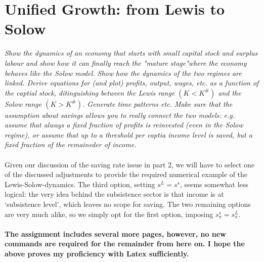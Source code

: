 \documentclass[a4paper]{article}
\begin{document}
\section{Unified Growth: from Lewis to Solow}
\textit{Show the dynamics of an economy that starts with small capital stock and surplus labour and show how it can finally reach the "mature stage"where the economy behaves like the Solow model. Show how the dynamics of the two regimes are linked. Derive equations for (and plot) profits, output, wages, etc. as  a function of the captial stock, ditinguishing between the Lewis range $(K<K^{\#})$ and the Solow range $(K>K^{\#})$. Generate time patterns etc. Make sure that the assumption about savings allows you to really connect the two models: e.g. assume that always a fixed fraction of profits is reinvested (even in the Solow regime), or assume that up to a threshold per captia income level is saved, but a fixed fraction of the remaineder of income.}\\
\newline\\
Given our discussion of the saving rate issue in part 2, we will have to select one of the discussed adjustments to provide the required numerical example of the Lewis-Solow-dynamics. The third option, setting $s^L=s^s$, seems somewhat less logical: the very idea behind the subsistence sector is that income is at ‘subsistence level’, which leaves no scope for saving. The two remaining options are very much alike, so we simply opt for the first option, imposing $s_\pi^s=s_\pi^L$.\\
\newline\\
\noindent\textbf{The assignment includes several more pages, however, no new commands are required for the remainder from here on. I hope the above proves my proficiency with Latex sufficiently.}
\end{document}
